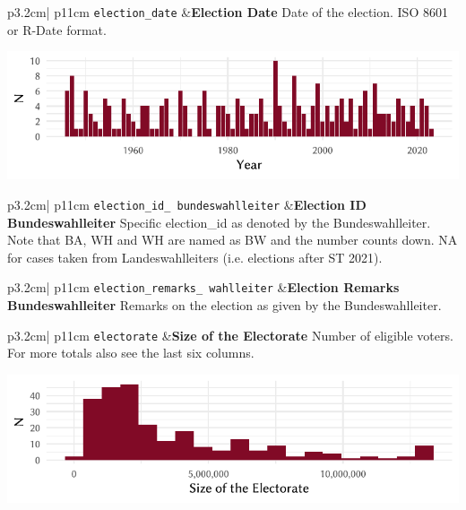 \documentclass[
]{scrartcl}
\begin{document}
\begin{longtable}{p{3.2cm}| p{11cm}}
\texttt{election\_date} &\textbf{Election Date}\newline 
Date of the election.  ISO 8601 or R-Date format.






\hspace*{.25cm}
\begin{minipage}[t]{\linewidth }
\vspace{0pt}
\includegraphics[width = \linewidth]{cbfiles/electiondatesplot.pdf}
\end{minipage}






\end{longtable}

\begin{longtable}{p{3.2cm}| p{11cm}}
\texttt{election\_id\_
bundeswahlleiter} &\textbf{Election ID Bundeswahlleiter}\newline 
Specific election\_id as denoted by the Bundeswahlleiter. Note that BA, WH and WH are named as BW and the number counts down. NA for cases taken from Landeswahlleiters (i.e. elections after ST 2021).
\end{longtable}

\begin{longtable}{p{3.2cm}| p{11cm}}
\texttt{election\_remarks\_
wahlleiter} &\textbf{Election Remarks Bundeswahlleiter}\newline 
Remarks on the election as given by the Bundeswahlleiter.
\end{longtable}

\begin{longtable}{p{3.2cm}| p{11cm}}
\texttt{electorate} &\textbf{Size of the Electorate}\newline 
Number of eligible voters. For more totals also see the last six columns.

\hspace*{.25cm}
\begin{minipage}[t]{\linewidth }
\vspace{0pt}
\includegraphics[width = \linewidth]{cbfiles/electorateplot.pdf}
\end{minipage}


\end{longtable}
\end{document}
